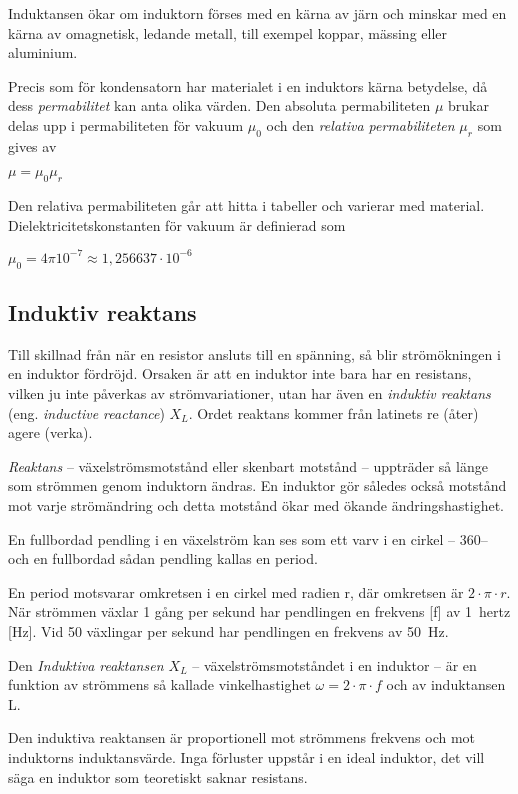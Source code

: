 Induktansen ökar om induktorn förses med en kärna av järn och minskar med en
kärna av omagnetisk, ledande metall, till exempel koppar, mässing eller aluminium.

Precis som för kondensatorn har materialet i en induktors kärna betydelse,
då dess \emph{permabilitet} kan anta olika värden. Den absoluta permabiliteten
\(\mu\) brukar delas upp i permabiliteten för vakuum \(\mu_0\) och den
\emph{relativa permabiliteten} \(\mu_r\) som gives av

\(\mu = \mu_0\mu_r\)

Den relativa permabiliteten går att hitta i tabeller och varierar med material.
Dielektricitetskonstanten för vakuum är definierad som

\(\mu_0 = 4\pi 10^{-7} \approx 1,256637 \cdot 10^{-6}\)

\subsection{Induktiv reaktans}

Till skillnad från när en resistor ansluts till en spänning, så blir
strömökningen i en induktor fördröjd. Orsaken är att en induktor inte bara har
en resistans, vilken ju inte påverkas av strömvariationer, utan har även en
\emph{induktiv reaktans} (eng. \emph{inductive reactance}) \(X_L\).
Ordet reaktans kommer från latinets re (åter) agere (verka).

\emph{Reaktans} -- växelströmsmotstånd eller skenbart motstånd -- uppträder så
länge som strömmen genom induktorn ändras. En induktor gör således också
motstånd mot varje strömändring och detta motstånd ökar med ökande
ändringshastighet.

En fullbordad pendling i en växelström kan ses som ett varv i en cirkel --
360\degree -- och en fullbordad sådan pendling kallas en period.

En period motsvarar omkretsen i en cirkel med radien r, där omkretsen är
\(2 \cdot \pi  \cdot r\). När strömmen växlar 1 gång per sekund har
pendlingen en frekvens [f] av 1~hertz [Hz]. Vid 50 växlingar per sekund har
pendlingen en frekvens av 50~Hz.

Den \emph{Induktiva reaktansen \(X_L\)} -- växelströmsmotståndet i en induktor -- 
är en funktion av strömmens så kallade vinkelhastighet \(\omega = 2 \cdot \pi  \cdot f\)
och av induktansen L.

Den induktiva reaktansen är proportionell mot strömmens frekvens och mot
induktorns induktansvärde. Inga förluster uppstår i en ideal induktor, det vill säga 
en induktor som teoretiskt saknar resistans.

